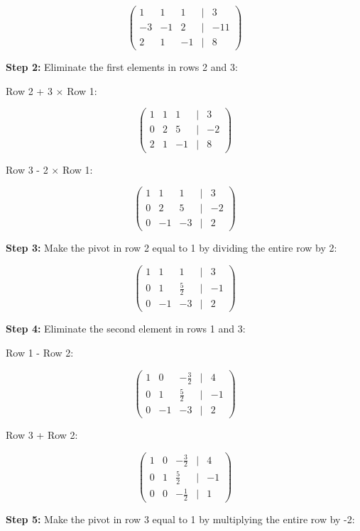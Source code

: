 \[
    \begin{pmatrix}
    1 & 1 & 1 & | & 3 \\
    -3 & -1 & 2 & | & -11 \\
    2 & 1 & -1 & | & 8
    \end{pmatrix}
\]

\textbf{Step 2:} Eliminate the first elements in rows 2 and 3:

Row 2 + 3 \(\times\) Row 1:

\[
    \begin{pmatrix}
    1 & 1 & 1 & | & 3 \\
    0 & 2 & 5 & | & -2 \\
    2 & 1 & -1 & | & 8
    \end{pmatrix}
\]

Row 3 - 2 \(\times\) Row 1:

\[
    \begin{pmatrix}
    1 & 1 & 1 & | & 3 \\
    0 & 2 & 5 & | & -2 \\
    0 & -1 & -3 & | & 2
    \end{pmatrix}
\]

\textbf{Step 3:} Make the pivot in row 2 equal to 1 by dividing the entire row by 2:

\[
    \begin{pmatrix}
    1 & 1 & 1 & | & 3 \\
    0 & 1 & \frac{5}{2} & | & -1 \\
    0 & -1 & -3 & | & 2
    \end{pmatrix}
\]

\textbf{Step 4:} Eliminate the second element in rows 1 and 3:

Row 1 - Row 2:

\[
    \begin{pmatrix}
    1 & 0 & -\frac{3}{2} & | & 4 \\
    0 & 1 & \frac{5}{2} & | & -1 \\
    0 & -1 & -3 & | & 2
    \end{pmatrix}
\]

Row 3 + Row 2:

\[
    \begin{pmatrix}
    1 & 0 & -\frac{3}{2} & | & 4 \\
    0 & 1 & \frac{5}{2} & | & -1 \\
    0 & 0 & -\frac{1}{2} & | & 1
    \end{pmatrix}
\]

\textbf{Step 5:} Make the pivot in row 3 equal to 1 by multiplying the entire row by -2:

